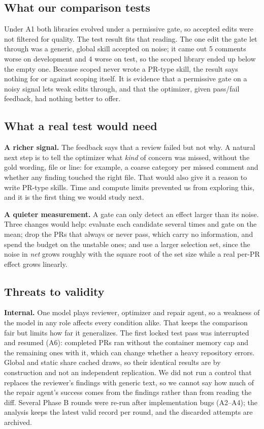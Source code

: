 \documentclass[sigconf, authorversion, nonacm]{acmart}
\begin{document}
\subsection{What our comparison tests}
Under A1 both libraries evolved under a permissive gate, so accepted edits were not filtered for quality. The test result fits that reading. The one edit the gate let through was a generic, global skill accepted on noise; it came out 5 comments worse on development and 4 worse on test, so the scoped library ended up below the empty one. Because scoped never wrote a PR-type skill, the result says nothing for or against scoping itself. It is evidence that a permissive gate on a noisy signal lets weak edits through, and that the optimizer, given pass/fail feedback, had nothing better to offer.

\subsection{What a real test would need}\label{sec:next}
\textbf{A richer signal.} The feedback says that a review failed but not why. A natural next step is to tell the optimizer what \emph{kind} of concern was missed, without the gold wording, file or line: for example, a coarse category per missed comment and whether any finding touched the right file. That would also give it a reason to write PR-type skills. Time and compute limits prevented us from exploring this, and it is the first thing we would study next.

\textbf{A quieter measurement.} A gate can only detect an effect larger than its noise. Three changes would help: evaluate each candidate several times and gate on the mean; drop the PRs that always or never pass, which carry no information, and spend the budget on the unstable ones; and use a larger selection set, since the noise in \emph{net} grows roughly with the square root of the set size while a real per-PR effect grows linearly.

\subsection{Threats to validity}
\textbf{Internal.} One model plays reviewer, optimizer and repair agent, so a weakness of the model in any role affects every condition alike. That keeps the comparison fair but limits how far it generalizes. The first locked test pass was interrupted and resumed (A6): completed PRs ran without the container memory cap and the remaining ones with it, which can change whether a heavy repository errors. Global and static share cached draws, so their identical results are by construction and not an independent replication. We did not run a control that replaces the reviewer's findings with generic text, so we cannot say how much of the repair agent's success comes from the findings rather than from reading the diff. Several Phase B rounds were re-run after implementation bugs (A2--A4); the analysis keeps the latest valid record per round, and the discarded attempts are archived.
\end{document}
